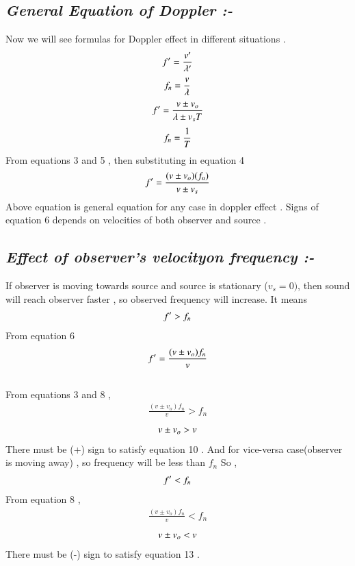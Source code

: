 \documentclass[journal,12pt,twocolumn]{IEEEtran}
\theoremstyle{remark}
\begin{document}
\subsection*{\textit{General \;Equation \;of \;Doppler :-}}
Now we will see formulas for Doppler effect in different situations . \\
\begin{align}{\label{eq2}}f' = \frac{v'}{\lambda'}\end{align}
\begin{align}{\label{eq3}}f_n = \frac{v}{\lambda}\end{align}
\begin{align}{\label{eq4}}f' = \frac{v \pm v_o}{\lambda \pm v_s T}\end{align}
\begin{align}{\label{eq5}}f_n = \frac{1}{T}\end{align}
From equations 3 and 5 , then substituting in equation 4
\begin{align}{\label{eq6}}f' = \frac{(v \pm v_o)(f_n)}{v \pm v_s }\end{align}
Above equation is general equation for any case in doppler effect .
Signs of equation 6 depends on velocities of both observer and source .
\subsection*{\textit{Effect \;of  \;observer's  \;velocity\;on \;frequency :-}}
If observer is moving towards source and source is stationary ($v_s=0)$, then sound will reach observer faster , so observed frequency will increase. It means \begin{align}{\label{eq7}}f'>f_n\end{align} From equation 6 \begin{align}{\label{eq8}} f' = \frac{(v \pm v_o)f_n}{v}\end{align}\\
From equations 3 and 8 , 
\begin{align} \frac{(v \pm v_o)f_n}{v} > f_n\end{align}
\begin{align}{\label{eq10}} v \pm v_o > v\end{align}
 There must be (+) sign to satisfy equation 10 .
And for vice-versa case(observer is moving away) , so frequency will be less than $f_n$
So ,\begin{align}{\label{eq11}}f'<f_n\end{align}
From equation 8 ,
\begin{align} \frac{(v \pm v_o)f_n}{v} < f_n\end{align}
\begin{align}{\label{eq13}} v \pm v_o < v\end{align}
There must be (-) sign to satisfy equation 13 .
\end{document}
